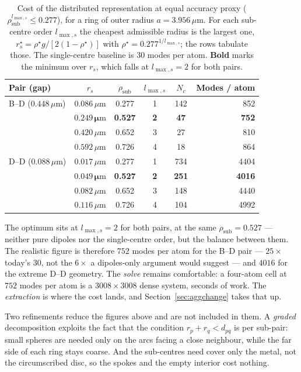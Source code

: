 \documentclass[11pt,a4paper]{article}
\newcommand{\um}{\ensuremath{\,\mu\mathrm{m}}}
\newcommand{\lmaxs}{\ensuremath{l_{\max,s}}}
\theoremstyle{plain}
\theoremstyle{definition}
\begin{document}
\begin{table}[htbp]
\centering\small
\caption{Cost of the distributed representation at equal accuracy proxy
($\rho_{\text{sub}}^{\lmaxs} \le 0.277$), for a ring of outer radius
$a = 3.956\um$. For each sub-centre order $\lmaxs$ the cheapest admissible radius
is the largest one, $r_s^\star = \rho^\star g / [2(1-\rho^\star)]$ with
$\rho^\star = 0.277^{1/\lmaxs}$; the rows tabulate those. The single-centre
baseline is $30$ modes per atom. \textbf{Bold} marks the minimum over $r_s$,
which falls at $\lmaxs = 2$ for both pairs.}
\label{tab:cost}
\begin{tabular}{@{}lccccr@{}}
\toprule
Pair (gap) & $r_s$ & $\rho_{\text{sub}}$ & $\lmaxs$ & $N_c$ & Modes / atom \\
\midrule
B--D ($0.448\um$) & $0.086\um$ & 0.277 & 1 & 142 & 852 \\
                  & $\mathbf{0.249\um}$ & \textbf{0.527} & \textbf{2} & \textbf{47} & \textcolor{good}{\textbf{752}} \\
                  & $0.420\um$ & 0.652 & 3 & 27  & 810 \\
                  & $0.592\um$ & 0.726 & 4 & 18  & 864 \\
\midrule
D--D ($0.088\um$) & $0.017\um$ & 0.277 & 1 & 734 & 4404 \\
                  & $\mathbf{0.049\um}$ & \textbf{0.527} & \textbf{2} & \textbf{251} & \textcolor{good}{\textbf{4016}} \\
                  & $0.082\um$ & 0.652 & 3 & 148 & 4440 \\
                  & $0.116\um$ & 0.726 & 4 & 104 & 4992 \\
\bottomrule
\end{tabular}
\end{table}

The optimum sits at $\lmaxs = 2$ for both pairs, at the same
$\rho_{\text{sub}} = 0.527$ --- neither pure dipoles nor the single-centre order,
but the balance between them. The realistic figure is therefore
$752$ modes per atom for the B--D pair --- $25\times$ today's $30$, not the
$6\times$ a dipoles-only argument would suggest --- and $4016$ for the extreme
D--D geometry. The \emph{solve} remains comfortable: a four-atom cell at $752$
modes per atom is a $3008 \times 3008$ dense system, seconds of work. The \emph{extraction} is where
the cost lands, and Section~\ref{sec:aggchange} takes that up.

Two refinements reduce the figures above and are not included in them. A
\emph{graded} decomposition exploits the fact that the condition
$r_p + r_q < d_{pq}$ is per sub-pair: small spheres are needed only on the arcs
facing a close neighbour, while the far side of each ring stays coarse. And the
sub-centres need cover only the metal, not the circumscribed disc, so the spokes
and the empty interior cost nothing.
\end{document}
